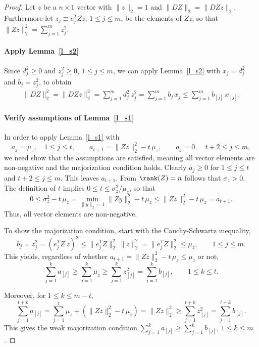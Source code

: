 \documentclass{siamltex}
\begin{document}
\begin{proof}
Let $z$ be a $n\times 1$ vector with $\|z\|_2=1$ and
$\|DZ\|_2=\|DZz\|_2$. Furthermore let $z_j\equiv e_j^TZz$, $1\leq j\leq m$, be
the elements of $Zz$, so that $\|Zz\|_2^2=\sum_{j=1}^m{z_j^2}$.
\smallskip

\paragraph{Apply Lemma~\ref{l_s2}}
Since $d_j^2\geq 0$ and $z_{j}^2\geq 0$, $1\leq j\leq m$, we can
apply Lemma~\ref{l_s2} with $x_j=d_{j}^2$ and $b_j=z_{j}^2$, to obtain
\begin{eqnarray*}
\|DZ\|_2^2=\|DZz\|_2^2= \sum_{j=1}^m{d_{j}^2\,z_{j}^2}=
\sum_{j=1}^m{b_j\, x_j}\leq \sum_{j=1}^m{b_{[j]}\,x_{[j]}}.
\end{eqnarray*}

\paragraph{Verify assumptions of Lemma~\ref{l_s1}}
In order to apply Lemma~\ref{l_s1} with 
$$a_j=\mu_z,  \quad 1\leq j\leq t,\qquad  a_{t+1}=\|Zz\|_2^2-t\,\mu_z,
\qquad a_j=0, \quad t+2\leq j\leq m,$$
we need show that the assumptions are satisfied,
meaning all  vector elements are non-negative and the
majorization condition holds. Clearly
$a_j\geq 0$ for  $1\leq j\leq t$ and $t+2\leq j\leq m$.
This leaves $a_{t+1}$. From $\rank(Z)=n$ follows that $\sigma_z>0$.
The definition of $t$ implies $0\leq t\leq \sigma_z^2/\mu_z$, so that
$$0\leq \sigma_z^2-t\,\mu_z=\min_{\|y\|_2=1}{\|Zy\|_2^2}-t\,\mu_z\leq 
\|Zz\|_2^2-t\,\mu_z=a_{t+1}.$$
Thus, all vector elements are non-negative.

To show the majorization condition, start with the 
Cauchy-Schwartz inequality,
$$b_j=z_{j}^2=(e_{j}^TZ\>z)^2\leq  
\|e_{j}^TZ\|_2^2\>\|z\|_2^2=\|e_{j}^TZ\|_2^2\leq \mu_z, \qquad
1\leq j\leq m.$$
This yields, regardless of whether
$a_{t+1}=\|Zz\|_2^2-t\,\mu_z\leq \mu_z$ or not, 
$$\sum_{j=1}^k{a_{[j]}}\geq\sum_{j=1}^k{\mu_z}\geq \sum_{j=1}^k{z_{[j]}^2}=
\sum_{j=1}^k{b_{[j]}},\qquad 1\leq k\leq t.$$

Moreover, for $1\leq k\leq m-t$,
$$\sum_{j=1}^{t+k}{a_{[j]}}=\sum_{j=1}^t{\mu_z}+(\|Zz\|_2^2-t\,\mu_z)
=\|Zz\|_2^2\geq \sum_{j=1}^{t+k}{z_{[j]}^2}=\sum_{j=1}^{t+k}{b_{[j]}}.$$
This gives the weak majorization condition
$\sum_{j=1}^k{a_{[j]}}\geq \sum_{j=1}^k{b_{[j]}}$, $1\leq k\leq m$.
\smallskip


\end{proof}
\end{document}

